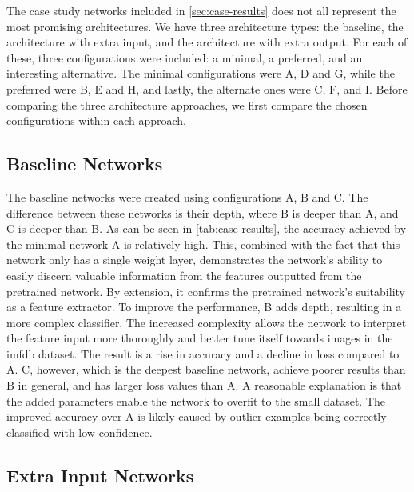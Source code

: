 The case study networks included in \autoref{sec:case-results} does not all represent the most promising architectures. We have three architecture types: the baseline, the architecture with extra input, and the architecture with extra output. For each of these, three configurations were included: a minimal, a preferred, and an interesting alternative. The minimal configurations were A, D and G, while the preferred were B, E and H, and lastly, the alternate ones were C, F, and I. Before comparing the three architecture approaches, we first compare the chosen configurations within each approach.

\subsection{Baseline Networks}

The baseline networks were created using configurations A, B and C. The difference between these networks is their depth, where B is deeper than A, and C is deeper than B. As can be seen in \autoref{tab:case-results}, the accuracy achieved by the minimal network A is relatively high. This, combined with the fact that this network only has a single weight layer, demonstrates the network's ability to easily discern valuable information from the features outputted from the pretrained network. By extension, it confirms the pretrained network's suitability as a feature extractor. To improve the performance, B adds depth, resulting in a more complex classifier. The increased complexity allows the network to interpret the feature input more thoroughly and better tune itself towards images in the \acrshort{imfdb} dataset. The result is a rise in accuracy and a decline in loss compared to A. C, however, which is the deepest baseline network, achieve poorer results than B in general, and has larger loss values than A. A reasonable explanation is that the added parameters enable the network to overfit to the small dataset. The improved accuracy over A is likely caused by outlier examples being correctly classified with low confidence.

\subsection{Extra Input Networks}

